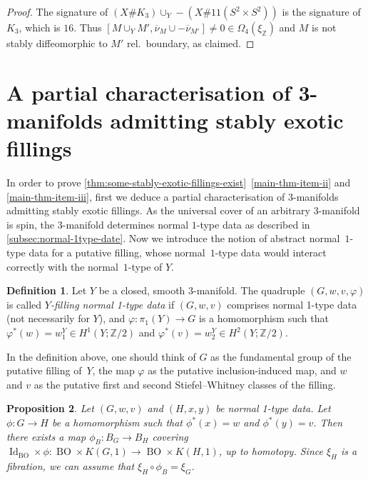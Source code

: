 \documentclass[a4paper, reqno]{amsart}
\newtheorem{proposition}{Proposition}[section]
\theoremstyle{definition}
\newtheorem{definition}[proposition]{Definition}
\theoremstyle{remark}
\newcommand{\Z}{\mathbb{Z}}
\newcommand{\id}{\operatorname{Id}}
\newcommand{\ol}{\overline}
\DeclareMathOperator{\BO}{BO}
\begin{document}
\begin{proof}
The signature of $(X\#K_3)\cup_Y -(X\#11(S^2\times S^2))$ is the signature of $K_3$, which is $16$. Thus $
[M\cup_Y M', \ol{\nu}_M \cup - \ol{\nu}_{M'}] \neq 0\in \Omega_4(\xi_\Z)$ and $M$ is not stably diffeomorphic to $M'$ rel.\ boundary, as claimed.
\end{proof}

\section{A partial characterisation of 3-manifolds admitting stably exotic fillings}\label{section:partial-characterisation}

In order to prove \cref{thm:some-stably-exotic-fillings-exist}~\eqref{main-thm-item-ii} and \eqref{main-thm-item-iii}, first we deduce a partial characterisation of $3$-manifolds admitting stably exotic fillings. As the universal cover of an arbitrary $3$-manifold is spin, the $3$-manifold determines normal $1$-type data as described in \cref{subsec:normal-1type-date}. Now we introduce the notion of abstract normal~$1$-type data for a putative filling, whose normal~$1$-type data would interact correctly with the normal~$1$-type of $Y$.

\begin{definition}\label{def:relY}
Let $Y$ be a closed, smooth $3$-manifold.
	The quadruple $(G,w,v,\varphi)$ is called 
    \emph{$Y$-filling normal 1-type data}
    if $(G,w,v)$ comprises normal 1-type data (not necessarily for $Y$), and $\varphi\colon \pi_1(Y)\to G$ is a homomorphism such that~$\varphi^*(w) = w_1^Y \in H^1(Y;\Z/2)$ and $\varphi^*(v) = w_2^Y \in H^2(Y;\Z/2)$.
\end{definition}
In the definition above, one should think of $G$ as the fundamental group of the putative filling of~$Y$, the map $\varphi$ as the putative inclusion-induced map, and $w$ and $v$ as the putative first and second Stiefel--Whitney classes of the filling.

\begin{proposition}\label{lemma:induced-map-on-1-types}
Let $(G,w,v)$ and $(H,x,y)$ be normal 1-type data.
  Let $\phi \colon G \to H$ be a homomorphism such that $\phi^*(x) = w$ and $\phi^*(y) = v$. Then there exists a map $\phi_B \colon B_G \to B_H$ covering $\id_{\BO} \times \phi \colon \BO \times K(G,1) \to \BO \times K(H,1)$, up to homotopy. Since $\xi_H$ is a fibration, we can assume that $\xi_H\circ \phi_B=\xi_G$.
\end{proposition}
\end{document}
